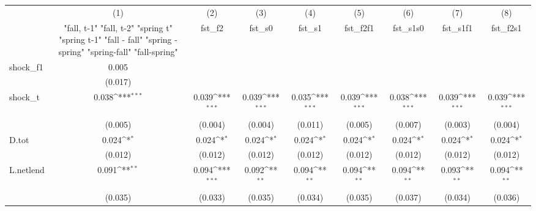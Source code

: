 {
\def\sym#1{\ifmmode^{#1}\else\(^{#1}\)\fi}
\begin{tabular}{l*{8}{c}}
\toprule
            &\multicolumn{1}{c}{(1)}&\multicolumn{1}{c}{(2)}&\multicolumn{1}{c}{(3)}&\multicolumn{1}{c}{(4)}&\multicolumn{1}{c}{(5)}&\multicolumn{1}{c}{(6)}&\multicolumn{1}{c}{(7)}&\multicolumn{1}{c}{(8)}\\
            &\multicolumn{1}{c}{  "fall, t-1" "fall, t-2" "spring t" "spring t-1"  "fall - fall" "spring - spring" "spring-fall" "fall-spring" }&\multicolumn{1}{c}{fst\_f2}&\multicolumn{1}{c}{fst\_s0}&\multicolumn{1}{c}{fst\_s1}&\multicolumn{1}{c}{fst\_f2f1}&\multicolumn{1}{c}{fst\_s1s0}&\multicolumn{1}{c}{fst\_s1f1}&\multicolumn{1}{c}{fst\_f2s1}\\
\midrule
shock\_f1    &       0.005         &                     &                     &                     &                     &                     &                     &                     \\
            &     (0.017)         &                     &                     &                     &                     &                     &                     &                     \\
\addlinespace
shock\_t     &       0.038\sym{***}&       0.039\sym{***}&       0.039\sym{***}&       0.035\sym{***}&       0.039\sym{***}&       0.038\sym{***}&       0.039\sym{***}&       0.039\sym{***}\\
            &     (0.005)         &     (0.004)         &     (0.004)         &     (0.011)         &     (0.005)         &     (0.007)         &     (0.003)         &     (0.004)         \\
\addlinespace
D.tot       &       0.024\sym{*}  &       0.024\sym{*}  &       0.024\sym{*}  &       0.024\sym{*}  &       0.024\sym{*}  &       0.024\sym{*}  &       0.024\sym{*}  &       0.024\sym{*}  \\
            &     (0.012)         &     (0.012)         &     (0.012)         &     (0.012)         &     (0.012)         &     (0.012)         &     (0.012)         &     (0.012)         \\
\addlinespace
L.netlend   &       0.091\sym{**} &       0.094\sym{***}&       0.092\sym{**} &       0.094\sym{**} &       0.094\sym{**} &       0.094\sym{**} &       0.093\sym{**} &       0.094\sym{**} \\
            &     (0.035)         &     (0.033)         &     (0.035)         &     (0.034)         &     (0.035)         &     (0.037)         &     (0.034)         &     (0.036)         \\

\end{tabular}}
